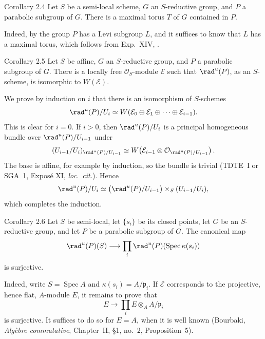 \begin{sgastatement}{Corollary 2.4}
Let \(S\) be a semi-local scheme, \(G\) an \(S\)-reductive group, and
\(P\) a parabolic subgroup of \(G\).  There is a maximal torus \(T\) of
\(G\) contained in \(P\).
\end{sgastatement}

Indeed, by  the group \(P\) has a Levi subgroup \(L\), and it suffices
to know that \(L\) has a maximal torus, which follows from Exp.\ XIV,
.

\begin{sgastatement}{Corollary 2.5}
Let \(S\) be affine, \(G\) an \(S\)-reductive group, and \(P\) a parabolic
subgroup of \(G\).  There is a locally free \(\mathcal O_S\)-module
\(\mathcal E\) such that \(\rad^u(P)\), as an \(S\)-scheme, is isomorphic
to \(W(\mathcal E)\).
\end{sgastatement}

We prove by induction on \(i\) that there is an isomorphism of \(S\)-schemes
\[
 \rad^u(P)/U_i
 \simeq
 W(\mathcal E_0\oplus\mathcal E_1\oplus\cdots\oplus\mathcal E_{i-1}).
\]
This is clear for \(i=0\).  If \(i>0\), then \(\rad^u(P)/U_i\) is a
principal homogeneous bundle over \(\rad^u(P)/U_{i-1}\) under
\[
 (U_{i-1}/U_i)_{\rad^u(P)/U_{i-1}}
 \simeq
 W\!\left(
 \mathcal E_{i-1}\otimes
 \mathcal O_{\rad^u(P)/U_{i-1}}
 \right).
\]
The base is affine, for example by induction, so the bundle is trivial
(TDTE~I or SGA~1, Exposé XI, \emph{loc.\ cit.}).  Hence
\[
 \rad^u(P)/U_i
 \simeq
 \bigl(\rad^u(P)/U_{i-1}\bigr)\times_S(U_{i-1}/U_i),
\]
which completes the induction.

\begin{sgastatement}{Corollary 2.6}
Let \(S\) be semi-local, let \(\{s_i\}\) be its closed points, let \(G\)
be an \(S\)-reductive group, and let \(P\) be a parabolic subgroup of
\(G\).  The canonical map
\[
 \rad^u(P)(S)\longrightarrow
 \prod_i\rad^u(P)(\operatorname{Spec}\kappa(s_i))
\]
is surjective.
\end{sgastatement}

Indeed, write \(S=\operatorname{Spec}A\) and
\(\kappa(s_i)=A/\mathfrak p_i\).  If \(\mathcal E\) corresponds to the
projective, hence flat, \(A\)-module \(E\), it remains to prove that
\[
 E\longrightarrow\prod_i E\otimes_A A/\mathfrak p_i
\]
is surjective.  It suffices to do so for \(E=A\), when it is well known
(Bourbaki, \emph{Algèbre commutative}, Chapter~II, §1, no.~2,
Proposition~5).

